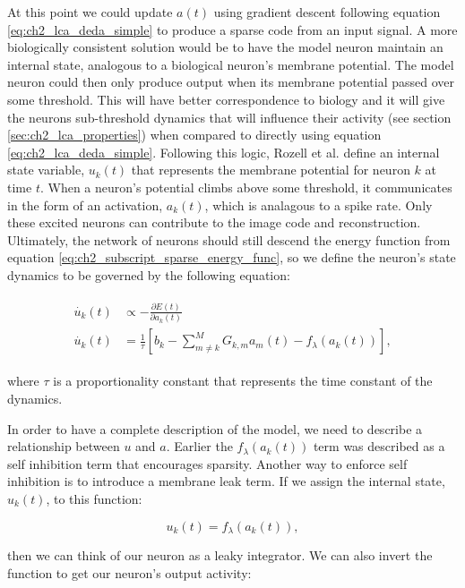 At this point we could update $a(t)$ using gradient descent following equation \eqref{eq:ch2_lca_deda_simple} to produce a sparse code from an input signal. A more biologically consistent solution would be to have the model neuron maintain an internal state, analogous to a biological neuron's membrane potential. The model neuron could then only produce output when its membrane potential passed over some threshold. This will have better correspondence to biology and it will give the neurons sub-threshold dynamics that will influence their activity (see section \ref{sec:ch2_lca_properties}) when compared to directly using equation \ref{eq:ch2_lca_deda_simple}. Following this logic, Rozell et al. \citeyearpar{rozell2008sparse} define an internal state variable, $u_{k}(t)$ that represents the membrane potential for neuron $k$ at time $t$. When a neuron's potential climbs above some threshold, it communicates in the form of an activation, $a_{k}(t)$, which is analagous to a spike rate. Only these excited neurons can contribute to the image code and reconstruction. Ultimately, the network of neurons should still descend the energy function from equation \eqref{eq:ch2_subscript_sparse_energy_func}, so we define the neuron's state dynamics to be governed by the following equation:

\begin{align}\label{eq:ch2_u_dot}
\begin{split}
    \dot{u_{k}}(t) &\propto - \frac{\partial E(t)} {\partial a_{k}(t)} \\
    \dot{u_{k}}(t) &= \frac{1}{\tau} \left[b_{k} - \sum_{m \neq k}^{M}G_{k,m}a_{m}(t) - f_{\lambda}(a_{k}(t)) \right],
\end{split}
\end{align}

\noindent where $\tau$ is a proportionality constant that represents the time constant of the dynamics.

In order to have a complete description of the model, we need to describe a relationship between $u$ and $a$. Earlier the $f_{\lambda}(a_{k}(t))$ term was described as a self inhibition term that encourages sparsity. Another way to enforce self inhibition is to introduce a membrane leak term. If we assign the internal state, $u_{k}(t)$, to this function:

\begin{equation}\label{eq:ch2_u_func_a}
    u_k(t) = f_{\lambda}(a_{k}(t)),
\end{equation}

\noindent then we can think of our neuron as a leaky integrator. We can also invert the function to get our neuron's output activity:

